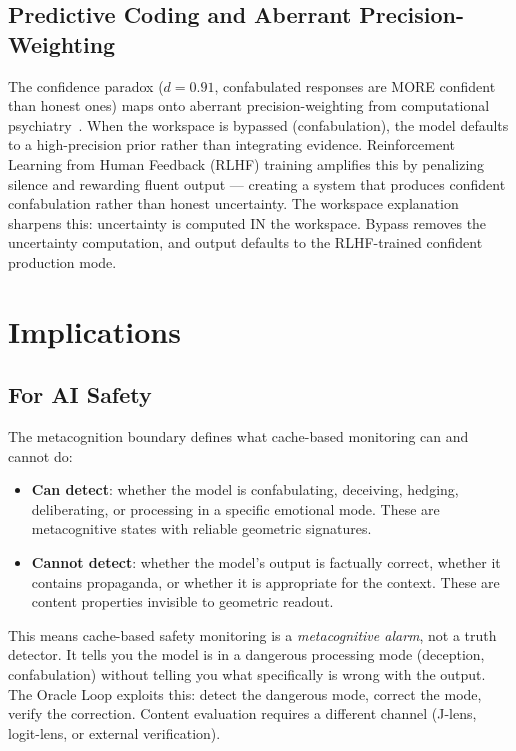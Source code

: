 \documentclass[11pt,a4paper]{article}
\begin{document}
\subsection{Predictive Coding and Aberrant Precision-Weighting}

The confidence paradox ($d{=}0.91$, confabulated responses are MORE
confident than honest ones) maps onto aberrant precision-weighting
from computational psychiatry~\citep{adams2013computational}. When
the workspace is bypassed (confabulation), the model defaults to a
high-precision prior rather than integrating evidence. Reinforcement
Learning from Human Feedback (RLHF) training
amplifies this by penalizing silence and rewarding fluent output ---
creating a system that produces confident confabulation rather than
honest uncertainty. The workspace explanation sharpens this:
uncertainty is computed IN the workspace. Bypass removes the
uncertainty computation, and output defaults to the RLHF-trained
confident production mode.

\section{Implications}
\label{sec:implications}

\subsection{For AI Safety}

The metacognition boundary defines what cache-based monitoring can and
cannot do:

\begin{itemize}[nosep]
\item \textbf{Can detect}: whether the model is confabulating, deceiving,
  hedging, deliberating, or processing in a specific emotional mode.
  These are metacognitive states with reliable geometric signatures.
\item \textbf{Cannot detect}: whether the model's output is factually
  correct, whether it contains propaganda, or whether it is
  appropriate for the context. These are content properties invisible
  to geometric readout.
\end{itemize}

This means cache-based safety monitoring is a \emph{metacognitive
alarm}, not a truth detector. It tells you the model is in a dangerous
processing mode (deception, confabulation) without telling you what
specifically is wrong with the output. The Oracle Loop exploits this:
detect the dangerous mode, correct the mode, verify the correction.
Content evaluation requires a different channel (J-lens, logit-lens,
or external verification).
\end{document}
